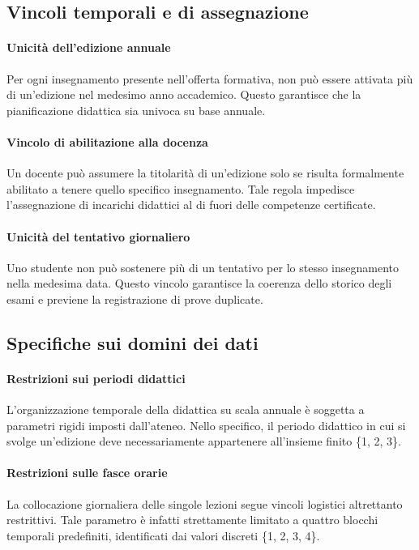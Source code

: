\subsection{Vincoli temporali e di assegnazione}
\label{ssec:vincoli-temporali-e-di-assegnazione}

\paragraph{Unicità dell'edizione annuale}
Per ogni insegnamento presente nell'offerta formativa, non può essere attivata più di un'edizione nel medesimo anno accademico.
Questo garantisce che la pianificazione didattica sia univoca su base annuale.

\paragraph{Vincolo di abilitazione alla docenza}
Un docente può assumere la titolarità di un'edizione solo se risulta formalmente abilitato a tenere quello specifico insegnamento.
Tale regola impedisce l'assegnazione di incarichi didattici al di fuori delle competenze certificate.

\paragraph{Unicità del tentativo giornaliero}
Uno studente non può sostenere più di un tentativo per lo stesso insegnamento nella medesima data. Questo vincolo garantisce la coerenza dello storico degli esami e previene la registrazione di prove duplicate.

\subsection{Specifiche sui domini dei dati}
\label{ssec:specifiche-sui-domini-dei-dati}

\paragraph{Restrizioni sui periodi didattici}
L'organizzazione temporale della didattica su scala annuale è soggetta a parametri rigidi imposti dall'ateneo.
Nello specifico, il periodo didattico in cui si svolge un'edizione deve necessariamente appartenere all'insieme finito \{1, 2, 3\}.

\paragraph{Restrizioni sulle fasce orarie}
La collocazione giornaliera delle singole lezioni segue vincoli logistici altrettanto restrittivi.
Tale parametro è infatti strettamente limitato a quattro blocchi temporali predefiniti, identificati dai valori discreti \{1, 2, 3, 4\}.

